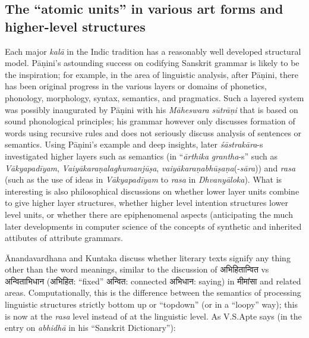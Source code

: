 \subsection{The “atomic units” in various art forms and higher-level structures}\label{chap7-sec4.1}

Each major \textsl{kalā} in the Indic tradition has a reasonably well developed structural model. Pāṇini’s astounding success on codifying Sanskrit grammar is likely to be the inspiration; for example, in the area of linguistic analysis, after Pāṇini, there has been original progress in the various layers or domains of phonetics, phonology, morphology, syntax, semantics, and pragmatics. Such a layered system was possibly inaugurated by Pāṇini with his \textsl{Māheswara} \textsl{sūtrāṇi} that is based on sound phonological principles; his grammar however only discusses formation of words using recursive rules and does not seriously discuss analysis of sentences or semantics. Using Pāṇini’s example and deep insights, later \textsl{śāstrakāra}-s investigated higher layers such as semantics (in “\textsl{ārthika} \textsl{grantha}-s” such as \textsl{Vākyapadīyam}, \textsl{Vaiyākaraṇalaghumanjūṣa}, \textsl{vaiyākaraṇabhūṣaṇa}(-\textsl{sāra})) and \textsl{rasa} (such as the use of ideas in \textsl{Vākyapadīyam} to \textsl{rasa} in \textsl{Dhvanyāloka}). What is interesting is also philosophical discussions on whether lower layer units combine to give higher layer structures, whether higher level intention structures lower level units, or whether there are epiphenomenal aspects (anticipating the much later developments in computer science of the concepts of synthetic and inherited attibutes of attribute grammars.

Ānandavardhana and Kuntaka discuss whether literary texts signify any thing other than the word meanings, similar to the discussion of {\dev अभिहितान्वित} vs {\dev अन्विताभिधान} ({\dev अभिहित:} “fixed” {\dev अन्वित:} connected {\dev अभिधान:} saying) in {\dev मीमांसा} and related areas. Computationally, this is the difference between the semantics of processing linguistic structures strictly bottom up or “topdown” (or in a “loopy” way); this is now at the \textsl{rasa} level instead of at the linguistic level. As V.S.Apte says (in the entry on \textsl{abhidhā} in his “Sanskrit Dictionary”):

